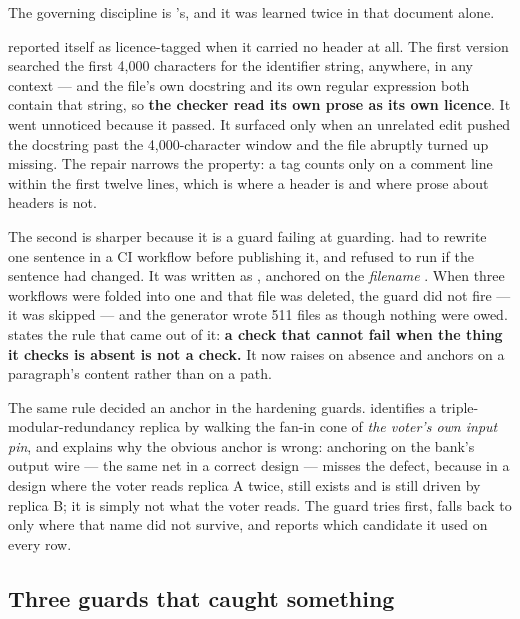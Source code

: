 The governing discipline is 's, and it was learned twice in
that document alone.

 reported itself as licence-tagged when it
carried no header at all. The first version searched the first 4,000
characters for the identifier string, anywhere, in any context --- and
the file's own docstring and its own regular expression both contain
that string, so \textbf{the checker read its own prose as its own
licence}. It went unnoticed because it passed. It surfaced only when an
unrelated edit pushed the docstring past the 4,000-character window and
the file abruptly turned up missing. The repair narrows the property: a
tag counts only on a comment line within the first twelve lines, which
is where a header is and where prose about headers is not.

The second is sharper because it is a guard failing at guarding.
 had to rewrite one sentence in a
CI workflow before publishing it, and refused to run if the sentence had
changed. It was written as , anchored on the
\emph{filename} . When three workflows
were folded into one and that file was deleted, the guard did not fire
--- it was skipped --- and the generator wrote 511 files as though
nothing were owed.  states the rule that came out
of it: \textbf{a check that cannot fail when the thing it checks is
absent is not a check.} It now raises on absence and anchors on a
paragraph's content rather than on a path.

The same rule decided an anchor in the hardening guards.
 identifies a
triple-modular-redundancy replica by walking the fan-in cone of
\emph{the voter's own input pin}, and  explains
why the obvious anchor is wrong: anchoring on the bank's output wire
 --- the same net in a correct design --- misses the defect,
because in a design where the voter reads replica A twice, 
still exists and is still driven by replica B; it is simply not what the
voter reads. The guard tries  first, falls back
to  only where that name did not survive, and reports which
candidate it used on every row.

\subsection{Three guards that caught something}

